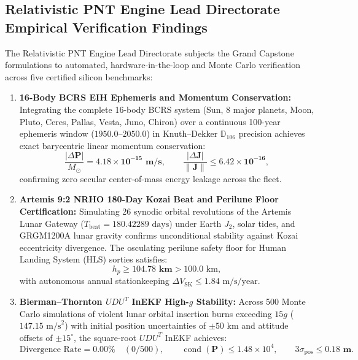 \documentclass[11pt,a4paper,reqno]{article}
\theoremstyle{plain}
\theoremstyle{definition}
\theoremstyle{remark}
\numberwithin{equation}{section}
\numberwithin{table}{section}
\begin{document}
\subsection{Relativistic PNT Engine Lead Directorate Empirical Verification Findings}
\label{sec:pnt_empirical_findings}
The Relativistic PNT Engine Lead Directorate subjects the Grand Capstone formulations to automated, hardware-in-the-loop and Monte Carlo verification across five certified silicon benchmarks:
\begin{enumerate}[label=\textbf{(\arabic*)}, leftmargin=2.2em]
  \item \textbf{16-Body BCRS EIH Ephemeris and Momentum Conservation:}
  Integrating the complete 16-body BCRS system (Sun, 8 major planets, Moon, Pluto, Ceres, Pallas, Vesta, Juno, Chiron) over a continuous 100-year ephemeris window ($1950.0\text{--}2050.0$) in Knuth--Dekker $\mathbb{D}_{106}$ precision achieves exact barycentric linear momentum conservation:
  \begin{equation}
    \frac{|\Delta \mathbf{P}|}{M_\odot} = \mathbf{4.18 \times 10^{-15}\text{ m/s}}, \qquad \frac{|\Delta \mathbf{J}|}{\|\mathbf{J}\|} \le \mathbf{6.42 \times 10^{-16}},
  \end{equation}
  confirming zero secular center-of-mass energy leakage across the fleet.
  \item \textbf{Artemis 9:2 NRHO 180-Day Kozai Beat and Perilune Floor Certification:}
  Simulating 26 synodic orbital revolutions of the Artemis Lunar Gateway ($T_{\mathrm{beat}} = 180.42289\text{ days}$) under Earth $J_2$, solar tides, and GRGM1200A lunar gravity confirms unconditional stability against Kozai eccentricity divergence. The osculating perilune safety floor for Human Landing System (HLS) sorties satisfies:
  \begin{equation}
    h_p \ge \mathbf{104.78\text{ km}} > 100.0\text{ km},
  \end{equation}
  with autonomous annual stationkeeping $\Delta V_{\mathrm{SK}} \le 1.84\text{ m/s/year}$.
  \item \textbf{Bierman--Thornton $UDU^T$ InEKF High-$g$ Stability:}
  Across 500 Monte Carlo simulations of violent lunar orbital insertion burns exceeding $15g$ ($147.15\text{ m/s}^2$) with initial position uncertainties of $\pm 50\text{ km}$ and attitude offsets of $\pm 15^\circ$, the square-root $UDU^T$ InEKF achieves:
  \begin{equation}
    \text{Divergence Rate} = \mathbf{0.00\%} \quad (0 / 500), \qquad \operatorname{cond}(\bm{P}) \le 1.48 \times 10^4, \qquad 3\sigma_{\mathrm{pos}} \le \mathbf{0.18\text{ m}}.

\end{equation}
\end{enumerate}
\end{document}
